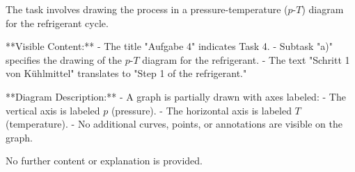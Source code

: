 The task involves drawing the process in a pressure-temperature (\(p\)-\(T\)) diagram for the refrigerant cycle.  

**Visible Content:**  
- The title "Aufgabe 4" indicates Task 4.  
- Subtask "a)" specifies the drawing of the \(p\)-\(T\) diagram for the refrigerant.  
- The text "Schritt 1 von Kühlmittel" translates to "Step 1 of the refrigerant."  

**Diagram Description:**  
- A graph is partially drawn with axes labeled:  
  - The vertical axis is labeled \(p\) (pressure).  
  - The horizontal axis is labeled \(T\) (temperature).  
- No additional curves, points, or annotations are visible on the graph.  

No further content or explanation is provided.